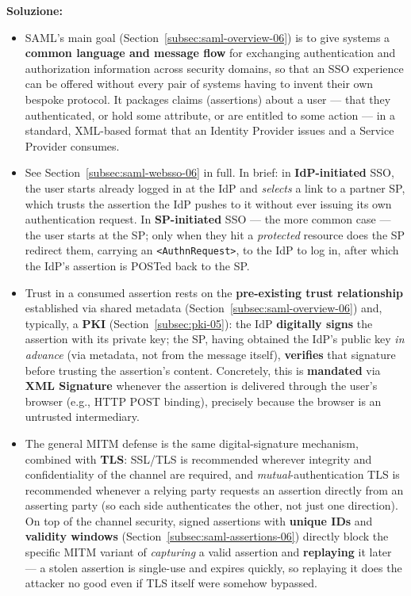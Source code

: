 \documentclass[12pt, a4paper]{article}
\begin{document}
\textbf{Soluzione:}
\begin{itemize}
    \item[(a)] SAML's main goal (Section~\ref{subsec:saml-overview-06}) is to give systems a \textbf{common language and message flow} for exchanging authentication and authorization information across security domains, so that an SSO experience can be offered without every pair of systems having to invent their own bespoke protocol. It packages claims (assertions) about a user --- that they authenticated, or hold some attribute, or are entitled to some action --- in a standard, XML-based format that an Identity Provider issues and a Service Provider consumes.
    \item[(b)] See Section~\ref{subsec:saml-websso-06} in full. In brief: in \textbf{IdP-initiated} SSO, the user starts already logged in at the IdP and \emph{selects} a link to a partner SP, which trusts the assertion the IdP pushes to it without ever issuing its own authentication request. In \textbf{SP-initiated} SSO --- the more common case --- the user starts at the SP; only when they hit a \emph{protected} resource does the SP redirect them, carrying an \texttt{<AuthnRequest>}, to the IdP to log in, after which the IdP's assertion is POSTed back to the SP.
    \item[(c)] Trust in a consumed assertion rests on the \textbf{pre-existing trust relationship} established via shared metadata (Section~\ref{subsec:saml-overview-06}) and, typically, a \textbf{PKI} (Section~\ref{subsec:pki-05}): the IdP \textbf{digitally signs} the assertion with its private key; the SP, having obtained the IdP's public key \emph{in advance} (via metadata, not from the message itself), \textbf{verifies} that signature before trusting the assertion's content. Concretely, this is \textbf{mandated} via \textbf{XML Signature} whenever the assertion is delivered through the user's browser (e.g., HTTP POST binding), precisely because the browser is an untrusted intermediary.
    \item[(d)] The general MITM defense is the same digital-signature mechanism, combined with \textbf{TLS}: SSL/TLS is recommended wherever integrity and confidentiality of the channel are required, and \emph{mutual}-authentication TLS is recommended whenever a relying party requests an assertion directly from an asserting party (so each side authenticates the other, not just one direction). On top of the channel security, signed assertions with \textbf{unique IDs} and \textbf{validity windows} (Section~\ref{subsec:saml-assertions-06}) directly block the specific MITM variant of \emph{capturing} a valid assertion and \textbf{replaying} it later --- a stolen assertion is single-use and expires quickly, so replaying it does the attacker no good even if TLS itself were somehow bypassed.
\end{itemize}
\end{document}
